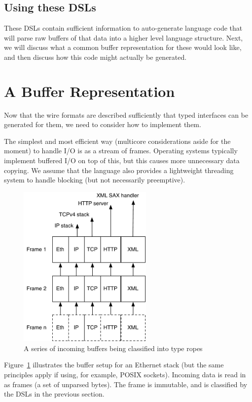 \documentclass{article}
\begin{document}
\subsection{Using these DSLs}

These DSLs contain sufficient information to auto-generate language code that will parse raw buffers of that data into a higher level language structure.  Next, we will discuss what a common buffer representation for these would look like, and then discuss how this code might actually be generated.

\section{A Buffer Representation}

Now that the wire formats are described sufficiently that typed interfaces can be generated for them, we need to consider how to implement them.

The simplest and most efficient way (multicore considerations aside for the moment) to handle I/O is as a stream of frames. Operating systems typically implement buffered I/O on top of this, but this causes more unnecessary data copying.  We assume that the language also provides a lightweight threading system to handle blocking (but not necessarily preemptive).

\begin{figure}
\centering
\includegraphics[height=8cm]{ropes.pdf}
\caption{\label{fig:ropes}A series of incoming buffers being classified into type ropes}
\end{figure}

Figure~\ref{fig:ropes} illustrates the buffer setup for an Ethernet stack (but the same principles apply if using, for example, POSIX sockets).  Incoming data is read in as frames (a set of unparsed bytes).  The frame is immutable, and is classified by the DSLs in the previous section.
\end{document}
